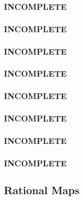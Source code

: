 \documentclass[12pt]{article}
\theoremstyle{definition}
\theoremstyle{definition}
\theoremstyle{definition}
\theoremstyle{definition}
\theoremstyle{definition}
\theoremstyle{definition}
\begin{document}
        \subsubsection{INCOMPLETE} 
        \subsubsection{INCOMPLETE} 
        \subsubsection{} 
        \subsubsection{INCOMPLETE} 
        \subsubsection{INCOMPLETE} 
        \subsubsection{INCOMPLETE} 
        \subsubsection{INCOMPLETE} 
        \subsubsection{INCOMPLETE} 
        \subsubsection{INCOMPLETE} 
        \subsubsection{} 
\newpage
    \subsection{Rational Maps}
        \subsubsection{} 
\end{document}
